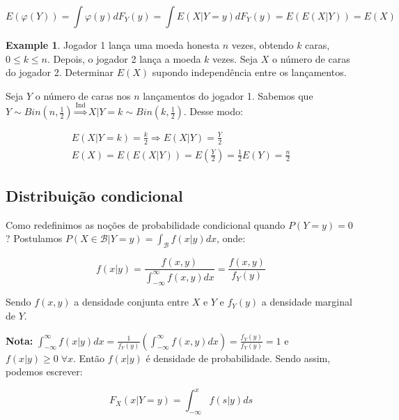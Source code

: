 \documentclass[
]{article}
\theoremstyle{definition}
\theoremstyle{definition}
\newtheorem{example}{Example}[section]
\theoremstyle{definition}
\theoremstyle{definition}
\theoremstyle{remark}
\begin{document}
\begin{equation*}
E(\varphi(Y)) = \int \varphi(y)dF_{Y}(y) = \int E(X|Y = y)dF_{Y}(y) = E(E(X|Y)) = E(X)
\end{equation*}

\begin{example}
Jogador 1 lança uma moeda honesta \(n\) vezes, obtendo \(k\) caras, \(0 \le k \le n\). Depois, o jogador 2 lança a moeda \(k\) vezes. Seja \(X\) o número de caras do jogador 2. Determinar \(E(X)\) supondo independência entre os lançamentos.

Seja \(Y\) o número de caras nos \(n\) lançamentos do jogador 1. Sabemos que \(Y \sim Bin\left(n, \frac{1}{2}\right) \stackrel{\text{Ind}}{\Rightarrow}X|Y = k \sim Bin\left(k, \frac{1}{2}\right)\). Desse modo:

\begin{gather*}
E(X|Y = k) = \frac{k}{2} \Rightarrow E(X|Y) = \frac{Y}{2} \\
E(X) = E(E(X|Y)) = E\left(\frac{Y}{2}\right) = \frac{1}{2}E(Y) = \frac{n}{2}
\end{gather*}
\end{example}

\hypertarget{distribuiuxe7uxe3o-condicional}{%
\subsection{Distribuição condicional}\label{distribuiuxe7uxe3o-condicional}}

Como redefinimos as noções de probabilidade condicional quando \(P(Y = y) = 0\)? Postulamos \(P(X \in \mathcal{B}|Y = y) = \int_{\mathcal{B}}f(x|y)dx\), onde:

\begin{equation*}
f(x|y) = \frac{f(x,y)}{\int_{-\infty}^{\infty}f(x,y)dx} = \frac{f(x,y)}{f_{Y}(y)}
\end{equation*}

Sendo \(f(x,y)\) a densidade conjunta entre \(X \text{ e } Y\) e \(f_{Y}(y)\) a densidade marginal de \(Y\).

\textbf{Nota:} \(\int_{-\infty}^{\infty}f(x|y)dx = \frac{1}{f_{Y}(y)}\left(\int_{-\infty}^{\infty}f(x,y)dx\right) = \frac{f_{Y}(y)}{f_{Y}(y)} = 1\) e \(f(x|y) \ge 0 \; \forall x\). Então \(f(x|y)\) é densidade de probabilidade. Sendo assim, podemos escrever:

\begin{equation}
F_{X}(x|Y = y) = \int_{-\infty}^{x}f(s|y)ds
\label{eq:acumuladacond}
\end{equation}
\end{document}
